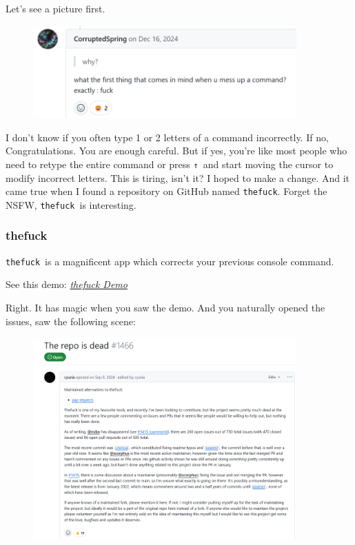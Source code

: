 \documentclass[12pt]{ctexart}
\newenvironment{mdquote}
{%
  \par\noindent
  \begin{list}{}{%
      \setlength{\leftmargin}{1em}%
      \setlength{\rightmargin}{0pt}%
      \setlength{\itemindent}{0pt}%
      \setlength{\listparindent}{\parindent}%
      \setlength{\topsep}{0.5\baselineskip}%
  }
  \item[\textbf{>}\ ]\itshape
}
{\end{list}\par}
\begin{document}
Let's see a picture first.

\begin{figure}[H]
    \centering
    \includegraphics[width=0.9\textwidth,keepaspectratio]{assets/Linux/2.5 What's the first word when messing up a command/1.png}
\end{figure}

I don't know if you often type 1 or 2 letters of a
command incorrectly. If no, Congratulations. You are enough careful. But
if yes, you're like most people who need to retype the
entire command or press \texttt{↑}\ and start moving the cursor to modify
incorrect letters. This is tiring, isn't it? I hoped to
make a change. And it came true when I found a repository on GitHub
named \texttt{thefuck}. Forget the NSFW, \texttt{thefuck}\ is
interesting.

\subsubsection{\textbf{thefuck}}

\begin{mdquote}
\texttt{thefuck}\ is a magnificent app which corrects your previous
console command.
\end{mdquote}

See this demo: \href{https://raw.githubusercontent.com/Octopus058/Introduction-to-Linux/refs/heads/main/assets/Linux/2.5%20What's%20the%20first%20word%20when%20messing%20up%20a%20command/example.gif}{\textit{thefuck Demo}}

Right. It has magic when you saw the demo. And you naturally opened the
issues, saw the following scene:

\begin{figure}[H]
    \centering
    \includegraphics[width=0.9\textwidth,keepaspectratio]{assets/Linux/2.5 What's the first word when messing up a command/2.png}
\end{figure}
\end{document}
